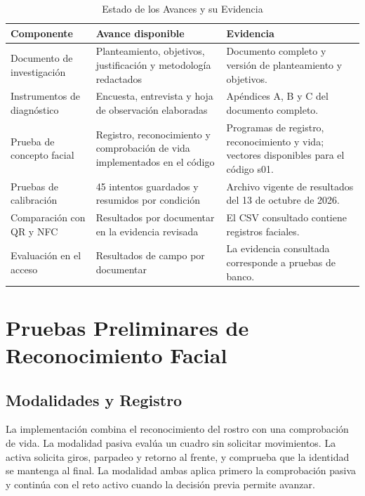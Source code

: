 \begin{table}[htbp]
\caption{Estado de los Avances y su Evidencia}
\label{tab:avances-estado}
{\small\linespread{1}\selectfont
\begin{tabular}{@{}P{3.7cm}P{4.4cm}P{4.8cm}@{}}
\toprule
Componente & Avance disponible & Evidencia \\
\midrule
Documento de investigación & Planteamiento, objetivos, justificación y
metodología redactados & Documento completo y versión de planteamiento y
objetivos. \\[0.5em]
Instrumentos de diagnóstico & Encuesta, entrevista y hoja de observación
elaboradas & Apéndices A, B y C del documento completo. \\[0.5em]
Prueba de concepto facial & Registro, reconocimiento y comprobación de vida
implementados en el código & Programas de registro, reconocimiento y vida;
vectores disponibles para el código s01. \\[0.5em]
Pruebas de calibración & 45 intentos guardados y resumidos por condición &
Archivo vigente de resultados del 13 de octubre de 2026. \\[0.5em]
Comparación con QR y NFC & Resultados por documentar en la evidencia
revisada & El CSV consultado contiene registros faciales. \\[0.5em]
Evaluación en el acceso & Resultados de campo por documentar & La evidencia
consultada corresponde a pruebas de banco. \\
\bottomrule
\end{tabular}}
\end{table}

\section{Pruebas Preliminares de Reconocimiento Facial}
\subsection{Modalidades y Registro}
La implementación combina el reconocimiento del rostro con una comprobación
de vida. La modalidad pasiva
evalúa un cuadro sin solicitar movimientos. La activa solicita giros,
parpadeo y retorno al frente, y comprueba que la identidad se mantenga al
final. La modalidad ambas aplica primero la comprobación pasiva y continúa
con el reto activo cuando la decisión previa permite avanzar.

